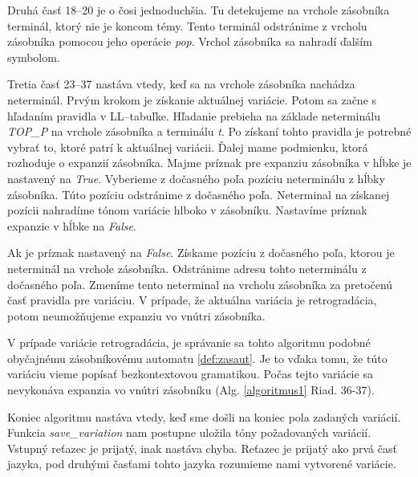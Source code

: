 Druhá časť 18--20 je o čosi jednoduchšia. Tu detekujeme na vrchole zásobníka terminál, ktorý nie je koncom témy. Tento terminál odstránime z vrcholu zásobníka pomocou jeho operácie \textit{pop}. Vrchol zásobníka sa nahradí ďalším symbolom.

Tretia časť 23--37 nastáva vtedy, keď sa na vrchole zásobníka nachádza neterminál. Prvým krokom je získanie aktuálnej variácie. Potom sa začne s hľadaním pravidla v LL--tabuľke. Hľadanie prebieha na základe neterminálu \textit{TOP\_P} na vrchole zásobníka a terminálu \textit{t}. Po získaní tohto pravidla je potrebné vybrať to, ktoré patrí k aktuálnej variácii. Ďalej mame podmienku, ktorá rozhoduje o expanzií zásobníka. Majme príznak pre expanziu zásobníka v hĺbke je nastavený na \textit{True}. Vyberieme z dočasného poľa pozíciu neterminálu z hĺbky zásobníka. Túto pozíciu odstránime z dočasného poľa. Neterminal na získanej pozícii nahradíme tónom variácie hlboko v zásobníku. Nastavíme príznak expanzie v hĺbke na \textit{False}. 

Ak je príznak nastavený na \textit{False}. Získame pozíciu z dočasného poľa, ktorou je neterminál na vrchole zásobníka. Odstránime adresu tohto neterminálu z dočasného poľa. Zmeníme tento neterminal na vrcholu zásobníka za pretočenú časť pravidla pre variáciu. V prípade, že aktuálna variácia je retrogradácia, potom neumožňujeme expanziu vo vnútri zásobníka.

V prípade variácie retrogradácia, je správanie sa tohto algoritmu podobné obyčajnému zásobníkovému automatu \ref{def:zasaut}. Je to vďaka tomu, že túto variáciu vieme popísať bezkontextovou gramatikou. Počas tejto variácie sa nevykonáva expanzia vo vnútri zásobníku (Alg. \ref{algoritmus1} Riad. 36-37).

Koniec algoritmu nastáva vtedy, keď sme došli na koniec pola zadaných variácií. Funkcia \textit{save\_variation} nam postupne uložila tóny požadovaných variácií. Vstupný reťazec je prijatý, inak nastáva chyba. Reťazec je prijatý ako prvá časť jazyka, pod druhými časťami tohto jazyka rozumieme nami vytvorené variácie.

